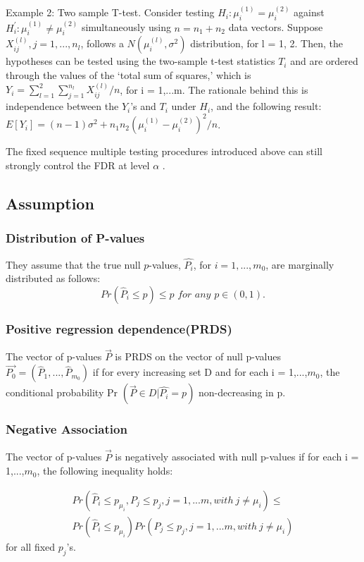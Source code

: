 \documentclass{article}
\begin{document}
Example 2: Two sample T-test. Consider testing $H_i : \mu_i^{(1)} = \mu_i^{(2)}$ against $H^{'}_i : \mu_i^{(1)} \neq \mu_i^{(2)}$ simultaneously using $n = n_1 + n_2$ data vectors. Suppose $X_{ij}^{(l)}, j =1,...,n_l$, follows a $N(\mu_i^{(l)}, \sigma^2)$ distribution, for l = 1, 2. Then, the hypotheses can be tested using
the two-sample t-test statistics $T_i$ and are ordered through the values of the ‘total sum of squares,’ which is $Y_i = \sum_{l=1}^{2} \sum_{j=1}^{n_l} X_{ij}^{(l)}/n$, for i = 1,...m. The rationale behind this is independence between the $Y_i$'s and $T_i$ under $H_i$, and the following result: $E[Y_i] = (n-1)\sigma^2 + n_1n_2(\mu_i^{(1)} - \mu_i^{(2)})^2/n$.

The fixed sequence multiple testing procedures introduced above can still strongly control the FDR at level $\alpha$ .
\cleardoublepage

\subsection{Assumption}
\subsubsection{Distribution of P-values}
They assume that the true null $p$-values, $\hat{P_i}$, for $i = 1,...,m_0$, are marginally distributed as follows:
$$ Pr\left(\hat P_i \leq p \right) \leq p \,\,for \,\,any \,\,p \in (0,1).$$
\subsubsection{Positive regression dependence(PRDS)}
The vector of p-values $\overrightarrow{P}$ is PRDS on the vector of null p-values $\overrightarrow{P_0} = (\hat{P}_1,...,\hat{P}_{m_0})$ if for every increasing set D and for each i = 1,...,$m_0$, the conditional probability Pr $\left(\overrightarrow{P} \in D | \hat{P_i} = p\right)$ non-decreasing in p.

\subsubsection{Negative Association}
The vector of p-values $\overrightarrow{P}$ is negatively associated with null p-values if for each i = 1,...,$m_0$, the following inequality holds:

\begin{align*}
Pr\left( \hat{P}_i \leq p_{\mu_i} , P_j \leq p_j , j = 1,...m, with \ j \neq \mu_i \right) \leq \\
Pr \left(\hat{P}_i \leq p_{\mu_i} \right) Pr \left( P_j \leq p_j , j = 1,...m, with \ j \neq \mu_i\right)
\end{align*}
for all fixed $p_j$'s.
\end{document}
